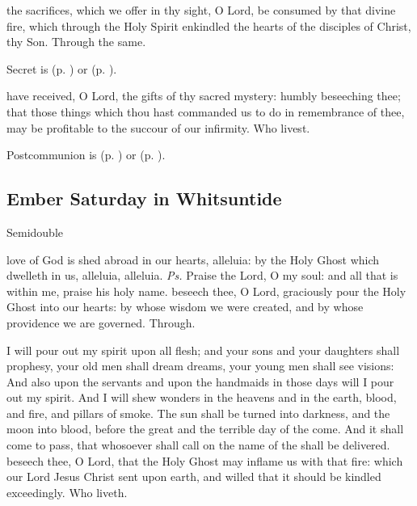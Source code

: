 
\secret
{} the sacrifices, which we offer in thy sight, O Lord, be consumed by that divine fire, which through the Holy Spirit enkindled the hearts of the disciples of Christ, thy Son. Through the same.
\begin{rubric}
     Secret is  (p. \pageref{SPAgainst}) or  (p. \pageref{SPChiefBishop}).
\end{rubric}


\postcommunion
{} have received, O Lord, the gifts of thy sacred mystery: humbly beseeching thee; that those things which thou hast commanded us to do in remembrance of thee, may be profitable to the succour of our infirmity. Who livest.
\begin{rubric}
     Postcommunion is  (p. \pageref{SPAgainst}) or  (p. \pageref{SPChiefBishop}).
\end{rubric}


\clearpage
\subsection{Ember Saturday in Whitsuntide}
\begin{inhead}
    {Semidouble}
\end{inhead}

\introit
{} love of God is shed abroad in our hearts, alleluia: by the Holy Ghost which dwelleth in us, alleluia, alleluia. \textit{Ps.} Praise the Lord, O my soul: and all that is within me, praise his holy name.
\collect
{} beseech thee, O Lord, graciously pour the Holy Ghost into our hearts: by whose wisdom we were created, and by whose providence we are governed. Through.

 I will pour out my spirit upon all flesh; and your sons and your daughters shall prophesy, your old men shall dream dreams, your young men shall see visions: And also upon the servants and upon the handmaids in those days will I pour out my spirit. And I will shew wonders in the heavens and in the earth, blood, and fire, and pillars of smoke. The sun shall be turned into darkness, and the moon into blood, before the great and the terrible day of the  come. And it shall come to pass, that whosoever shall call on the name of the  shall be delivered.
\collect
{} beseech thee, O Lord, that the Holy Ghost may inflame us with that fire: which our Lord Jesus Christ sent upon earth, and willed that it should be kindled exceedingly. Who liveth.

